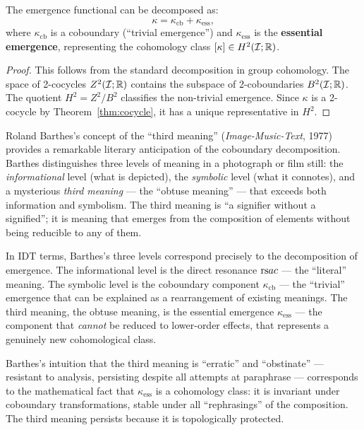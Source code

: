 \begin{theorem}
\label{thm:coboundary-decomp}
The emergence functional can be decomposed as:
\[
  \kappa = \kappa_{\mathrm{cb}} + \kappa_{\mathrm{ess}},
\]
where $\kappa_{\mathrm{cb}}$ is a coboundary (``trivial emergence'') and
$\kappa_{\mathrm{ess}}$ is the \textbf{essential emergence}, representing
the cohomology class $[\kappa] \in H^2(\mathcal{I}; \mathbb{R})$.
\end{theorem}

\begin{proof}
This follows from the standard decomposition in group cohomology.  The space of
2-cocycles $Z^2(\mathcal{I}; \mathbb{R})$ contains the subspace of 2-coboundaries
$B^2(\mathcal{I}; \mathbb{R})$.  The quotient $H^2 = Z^2/B^2$ classifies the
non-trivial emergence.  Since $\kappa$ is a 2-cocycle by
Theorem~\ref{thm:cocycle}, it has a unique representative in $H^2$.
\end{proof}

\begin{interpretation}
\label{interp:ch19:barthes_third_meaning}
Roland Barthes's concept of the ``third meaning'' (\textit{Image-Music-Text},
1977) provides a remarkable literary anticipation of the coboundary
decomposition.  Barthes distinguishes three levels of meaning in a
photograph or film still: the \emph{informational} level (what is depicted),
the \emph{symbolic} level (what it connotes), and a mysterious \emph{third
meaning} --- the ``obtuse meaning'' --- that exceeds both information and
symbolism.  The third meaning is ``a signifier without a signified''; it
is meaning that emerges from the composition of elements without being
reducible to any of them.

In IDT terms, Barthes's three levels correspond precisely to the
decomposition of emergence.  The informational level is the direct
resonance $\mathrm{rs}{a}{c}$ --- the ``literal'' meaning.  The symbolic level
is the coboundary component $\kappa_{\text{cb}}$ --- the ``trivial''
emergence that can be explained as a rearrangement of existing meanings.
The third meaning, the obtuse meaning, is the essential emergence
$\kappa_{\text{ess}}$ --- the component that \emph{cannot} be reduced to
lower-order effects, that represents a genuinely new cohomological class.

Barthes's intuition that the third meaning is ``erratic'' and ``obstinate''
--- resistant to analysis, persisting despite all attempts at paraphrase
--- corresponds to the mathematical fact that $\kappa_{\text{ess}}$ is
a cohomology class: it is invariant under coboundary transformations,
stable under all ``rephrasings'' of the composition.  The third meaning
persists because it is topologically protected.
\end{interpretation}

